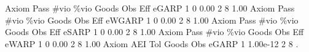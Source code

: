        Axiom {\VBAR} Pass        \#vio        \%vio       Goods         Obs         Eff  
       eGARP {\VBAR}    1           0        0.00           2           8        1.00  
{\smallskip}
{\smallskip}
{\smallskip}
       Axiom {\VBAR} Pass        \#vio        \%vio       Goods         Obs         Eff  
      eWGARP {\VBAR}    1           0        0.00           2           8        1.00  
{\smallskip}
{\smallskip}
{\smallskip}
       Axiom {\VBAR} Pass        \#vio        \%vio       Goods         Obs         Eff  
       eSARP {\VBAR}    1           0        0.00           2           8        1.00  
{\smallskip}
{\smallskip}
{\smallskip}
       Axiom {\VBAR} Pass        \#vio        \%vio       Goods         Obs         Eff  
       eWARP {\VBAR}    1           0        0.00           2           8        1.00  
{\smallskip}
       Axiom {\VBAR}       AEI        Tol      Goods        Obs 
       eGARP {\VBAR}         1   1.00e-12          2          8 
{\smallskip}
. 
